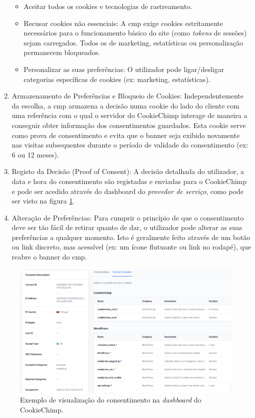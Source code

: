 \begin{enumerate}
    \begin{itemize}
        \item Aceitar todos os cookies e tecnologias de rastreamento.
        \item Recusar cookies não essenciais: A \acrshort{cmp} exige cookies estritamente necessários para o funcionamento básico do site (como \textit{tokens} de sessões) sejam carregados. Todos os de marketing, estatísticas ou personalização permanecem bloqueados.
        \item Personalizar as suas preferências: O utilizador pode ligar/desligar categorias específicas de cookies (ex: marketing, estatísticas).
    \end{itemize}
    \item Armazenamento de Preferências e Bloqueio de Cookies: Independentemente da escolha, a \acrshort{cmp} armazena a decisão numa cookie do lado do cliente com uma referência com o qual o servidor do CookieChimp interage de maneira a conseguir obter informação dos consentimentos guardados. Esta cookie serve como prova de consentimento e evita que o banner seja exibido novamente nas visitas subsequentes durante o período de validade do consentimento (ex: 6 ou 12 meses).
    \item Registo da Decisão (Proof of Consent): A decisão detalhada do utilizador, a data e hora do consentimento são registadas e enviadas para o CookieChimp e pode ser acedido através do dashboard do \textit{provedor de serviço}, como pode ser visto na figura \ref{fig:dashboard-visualizacao}.
    \item Alteração de Preferências: Para cumprir o princípio de que o consentimento deve ser tão fácil de retirar quanto de dar, o utilizador pode alterar as suas preferências a qualquer momento. Isto é geralmente feito através de um botão ou link discreto, mas acessível (ex: um ícone flutuante ou link no rodapé), que reabre o banner do \acrshort{cmp}.
\end{enumerate}


\begin{figure}[h]
    \begin{center}
	\includegraphics[width=1.0\textwidth]{images/consent.png}
    \end{center}
    \caption{Exemplo de visualização do consentimento na \textit{dashboard} do CookieChimp.}
\label{fig:dashboard-visualizacao}
\end{figure}

